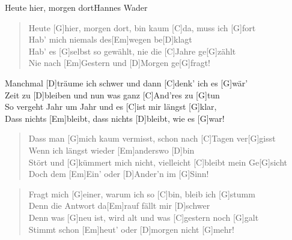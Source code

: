 \begin{song}{Heute hier, morgen dort}{Hannes Wader}

    \begin{verse}  
        Heute [G]hier, morgen dort, bin kaum [C]da, muss ich [G]fort \\
        Hab' mich niemals des[Em]wegen be[D]klagt \\
        Hab' es [G]selbst so gewählt, nie die [C]Jahre ge[G]zählt \\
        Nie nach [Em]Gestern und [D]Morgen ge[G]fragt!
    \end{verse}  

    \begin{chorus}
        Manchmal [D]träume ich schwer und dann [C]denk' ich es [G]wär' \\
        Zeit zu [D]bleiben und nun was ganz [C]And'res zu [G]tun \\
        So vergeht Jahr um Jahr und es [C]ist mir längst [G]klar,  \\
        Dass nichts [Em]bleibt, dass nichts [D]bleibt, wie es [G]war! 
    \end{chorus}

    \begin{verse}  
        Dass man [G]mich kaum vermisst, schon nach [C]Tagen ver[G]gisst \\
        Wenn ich längst wieder [Em]anderswo [D]bin \\
        Stört und [G]kümmert mich nicht, vielleicht [C]bleibt mein Ge[G]sicht \\
        Doch dem [Em]Ein' oder [D]Ander'n im [G]Sinn!
    \end{verse}  


    \begin{verse}  
        Fragt mich [G]einer, warum ich so [C]bin, bleib ich [G]stumm \\
        Denn die Antwort da[Em]rauf fällt mir [D]schwer \\
        Denn was [G]neu ist, wird alt und was [C]gestern noch [G]galt \\
        Stimmt schon [Em]heut' oder [D]morgen nicht [G]mehr!
    \end{verse}  


\end{song}
